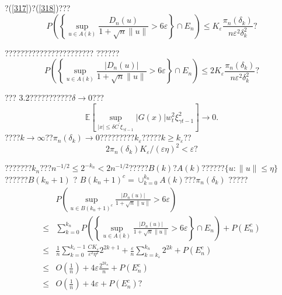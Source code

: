 \documentclass[a4paper,12pt,openany,oneside,utf-8]{ctexbook}
\begin{document}
	\noindent ?(\ref{317})?(\ref{318})???
	\begin{equation}
		P\left(\left\{\sup _{u \in A(k)} \frac{D_{n}(u)}{1+\sqrt{n}\|u\|}>6 \varepsilon\right\} \cap E_{n}\right) \leq K_{\varepsilon} \frac{\pi_{n}\left(\delta_{k}\right)}{n \varepsilon^{2} \delta_{k}^{2}}\mbox{?}\nonumber
	\end{equation}
	
	\noindent ??????????????????????? ??????
	\begin{equation}\label{319}
		P\left(\left\{\sup _{u \in A(k)} \frac{\left|D_{n}(u)\right|}{1+\sqrt{n}\|u\|}>6 \varepsilon\right\} \cap E_{n}\right) \leq 2 K_{\varepsilon} \frac{\pi_{n}\left(\delta_{k}\right)}{n \varepsilon^{2} \delta_{k}^{2}}\mbox{?}
	\end{equation}
	
	\noindent ??? 3.2???????????$\delta \rightarrow 0$???
	\begin{equation}
		\mathbb{E}\left[\sup _{|x| \leq \delta C^{\prime} \xi_{\gamma t-1}}|G(x)| w_{t}^{2} \xi_{\gamma t-1}^{2}\right] \rightarrow 0 .\nonumber
	\end{equation}
	????$k \rightarrow \infty$??$\pi_{n}\left(\delta_{k}\right) \rightarrow 0$?????????$k_{\varepsilon}$?????$k \ge k_{\varepsilon}$??$$2 \pi_{n}\left(\delta_{k}\right) K_{\varepsilon} /(\varepsilon \eta)^{2}<\varepsilon\mbox{?}$$
	
	???????$k_n$???$n^{-1 / 2} \leq 2^{-k_{n}}<2 n^{-1 / 2}$?????$B(k)$?$A(k)$??????$\{u :\|u\| \leq \eta \}$??????$B\left(k_{n}+1\right)$ ? $B\left(k_{n}+1\right)^{c}=\cup_{k=0}^{k_{n}} A(k)$???$\pi_{n}\left(\delta_{k}\right)$ ?????
	\begin{align}\label{320}
		&P\left(\sup _{u \in B\left(k_{n}+1\right)^{c}} \frac{\left|D_{n}(u)\right|}{1+\sqrt{n}\|u\|}>6 \varepsilon\right)\nonumber\\
		\le &\sum_{k=0}^{k_{n}} P\left(\left\{\sup _{u \in A(k)} \frac{\left|D_{n}(u)\right|}{1+\sqrt{n}\|u\|}>6 \varepsilon \right\} \cap E_{n} \right)+P\left(E_{n}^{c}\right) \nonumber\\
		\le &\frac{1}{n} \sum_{k=0}^{k_{\varepsilon}-1} \frac{C K_{\varepsilon}}{\varepsilon^{2} \eta^{2}} 2^{2 k+1}+\frac{\varepsilon}{n} \sum_{k=k_{\varepsilon}}^{k_{n}} 2^{2 k}+P\left(E_{n}^{c}\right) \nonumber\\
		\le &O\left(\frac{1}{n}\right)+4 \varepsilon \frac{2^{2 k_{n}}}{n}+P\left(E_{n}^{c}\right) \nonumber \\
		\le &O\left(\frac{1}{n}\right)+4 \varepsilon+P\left(E_{n}^{c}\right)\mbox{?}
	\end{align}
	
\end{document}
